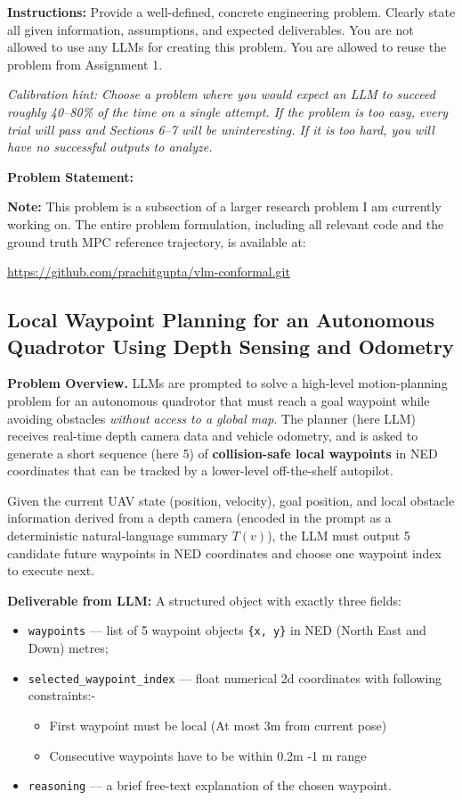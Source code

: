 \documentclass[12pt]{article}
\begin{document}
\noindent\textbf{Instructions:} Provide a well-defined, concrete engineering problem. Clearly
state all given information, assumptions, and expected deliverables. You are not allowed to use
any LLMs for creating this problem. You are allowed to reuse the problem from Assignment 1.

\medskip
\noindent\textit{Calibration hint: Choose a problem where you would expect an LLM to succeed
roughly 40--80\% of the time on a single attempt. If the problem is too easy, every trial will
pass and Sections 6--7 will be uninteresting. If it is too hard, you will have no successful
outputs to analyze.}

\bigskip
\noindent\textbf{Problem Statement:}

\medskip
\noindent\textbf{Note:} This problem is a subsection of a larger research problem I am currently
working on. The entire problem formulation, including all relevant code and the ground truth MPC
reference trajectory, is available at:
\begin{center}
  \url{https://github.com/prachitgupta/vlm-conformal.git}
\end{center}

\subsection*{Local Waypoint Planning for an Autonomous Quadrotor Using Depth Sensing and
Odometry}

\noindent\textbf{Problem Overview.}
LLMs are prompted to solve a high-level motion-planning problem for an autonomous quadrotor that
must reach a goal waypoint while avoiding obstacles \emph{without access to a global map}. The
planner (here LLM) receives real-time depth camera data and vehicle odometry, and is asked to
generate a short sequence (here 5) of \textbf{collision-safe local waypoints} in NED coordinates
that can be tracked by a lower-level off-the-shelf autopilot.

Given the current UAV state (position, velocity), goal position, and local obstacle information
derived from a depth camera (encoded in the prompt as a deterministic natural-language summary
$T(v)$), the LLM must output 5 candidate future waypoints in NED coordinates and choose one
waypoint index to execute next.

\medskip
\noindent\textbf{Deliverable from LLM:} A structured object with exactly three fields:
\begin{itemize}
  \item \texttt{waypoints} --- list of 5 waypoint objects \texttt{\{x, y\}} in NED (North East and Down)  metres;
  \item \texttt{selected\_waypoint\_index} ---  float numerical 2d coordinates with following constraints:-
  \begin{itemize}
      \item First waypoint must be local (At most 3m from current pose)
      \item Consecutive waypoints have to be within 0.2m -1 m range 
  \end{itemize}
  \item \texttt{reasoning} --- a brief free-text explanation of the chosen waypoint.
\end{itemize}
\end{document}
